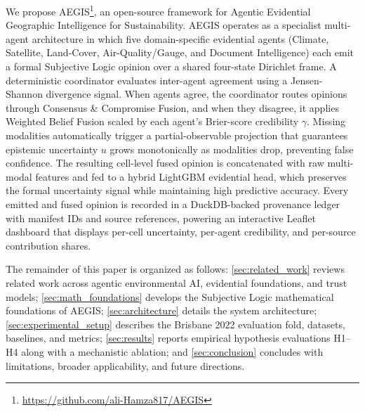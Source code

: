 We propose AEGIS\footnote{\url{https://github.com/ali-Hamza817/AEGIS}}, an open-source framework for Agentic Evidential Geographic Intelligence for Sustainability. AEGIS operates as a specialist multi-agent architecture in which five domain-specific evidential agents (Climate, Satellite, Land-Cover, Air-Quality/Gauge, and Document Intelligence) each emit a formal Subjective Logic opinion over a shared four-state Dirichlet frame. A deterministic coordinator evaluates inter-agent agreement using a Jensen-Shannon divergence signal. When agents agree, the coordinator routes opinions through Consensus \& Compromise Fusion, and when they disagree, it applies Weighted Belief Fusion scaled by each agent's Brier-score credibility $\gamma$. Missing modalities automatically trigger a partial-observable projection that guarantees epistemic uncertainty $u$ grows monotonically as modalities drop, preventing false confidence. The resulting cell-level fused opinion is concatenated with raw multi-modal features and fed to a hybrid LightGBM evidential head, which preserves the formal uncertainty signal while maintaining high predictive accuracy. Every emitted and fused opinion is recorded in a DuckDB-backed provenance ledger with manifest IDs and source references, powering an interactive Leaflet dashboard that displays per-cell uncertainty, per-agent credibility, and per-source contribution shares.

The remainder of this paper is organized as follows: \cref{sec:related_work} reviews related work across agentic environmental AI, evidential foundations, and trust models; \cref{sec:math_foundations} develops the Subjective Logic mathematical foundations of AEGIS; \cref{sec:architecture} details the system architecture; \cref{sec:experimental_setup} describes the Brisbane 2022 evaluation fold, datasets, baselines, and metrics; \cref{sec:results} reports empirical hypothesis evaluations H1--H4 along with a mechanistic ablation; and \cref{sec:conclusion} concludes with limitations, broader applicability, and future directions.

